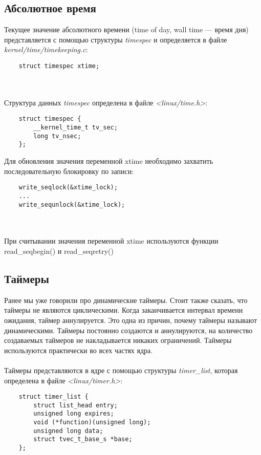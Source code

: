     \subsection{Абсолютное время}
    Текущее значение абсолютного времени (time of day, wall time — время дня) представляется с помощью структуры \textit{timespec} и определяется в файле \textit{kernel/time/timekeeping.c}:
    \begin{lstlisting}
    struct timespec xtime;
    \end{lstlisting}
    \\\\
    Структура данных \textit{timespec} определена в файле \textit{<linux/time.h>}:
    \begin{lstlisting}
    struct timespec {
        __kernel_time_t tv_sec;
        long tv_nsec;
    };
    \end{lstlisting}
    Для обновления значения переменной xtime необходимо захватить последовательную блокировку по записи:
    \begin{lstlisting}
    write_seqlock(&xtime_lock);
    ...
    write_sequnlock(&xtime_lock);
    \end{lstlisting}
    \\\\
    При считывании значения переменной xtime используются функции read\_seqbegin() и read\_seqretry()
    
    \subsection{Таймеры}
    Ранее мы уже говорили про динамические таймеры. Стоит также сказать, что таймеры не являются циклическими. Когда заканчивается интервал времени ожидания, таймер аннулируется. Это одна из причин, почему таймеры называют динамическими. Таймеры постоянно создаются и аннулируются, на количество создаваемых таймеров не накладывается никаких ограничений. Таймеры используются практически во всех частях ядра.
    \\\\
    Таймеры представляются в ядре с помощью структуры \textit{timer\_list}, которая определена в файле \textit{<linux/timer.h>}:
    \begin{lstlisting}
    struct timer_list {
        struct list_head entry; 
        unsigned long expires;
        void (*function)(unsigned long);
        unsigned long data;
        struct tvec_t_base_s *base;
    };
    \end{lstlisting}
    
